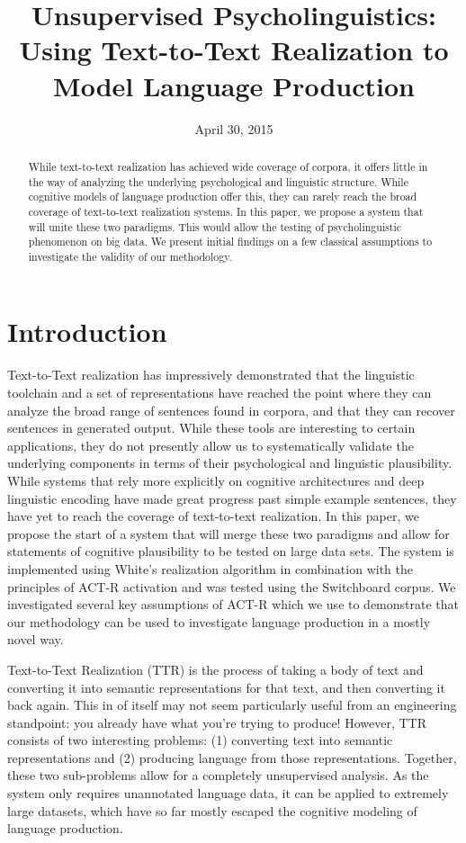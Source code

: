\documentclass[11pt]{article}
\title{Unsupervised Psycholinguistics: Using Text-to-Text Realization to Model Language Production}
\author{%
}
\date{April 30, 2015}
\begin{document}
\maketitle
\begin{abstract}
While text-to-text realization has achieved wide coverage of corpora, it offers little in the way of analyzing the underlying psychological and linguistic structure. While cognitive models of language production offer this, they can rarely reach the broad coverage of text-to-text realization systems. In this paper, we propose a system that will unite these two paradigms. This would allow the testing of psycholinguistic phenomenon on big data. We present initial findings on a few classical assumptions to investigate the validity of our methodology.  
\end{abstract}

\section{Introduction}
Text-to-Text realization has impressively demonstrated that the linguistic toolchain and a set of representations have reached the point where they can analyze the broad range of sentences found in corpora, and that they can recover sentences in generated output. While these tools are interesting to certain applications, they do not presently allow us to systematically validate the underlying components in terms of their psychological and linguistic plausibility. While systems that rely more explicitly on cognitive architectures and deep linguistic encoding have made great progress past simple example sentences, they have yet to reach the coverage of text-to-text realization. In this paper, we propose the start of a system that will merge these two paradigms  and allow for statements of cognitive plausibility to be tested on large data sets. The system is implemented using White's realization algorithm \citep{chart} in combination with the principles of ACT-R activation \citep{actr} and was tested using the Switchboard corpus. We investigated several key assumptions of ACT-R which we use to demonstrate that our methodology can be used to investigate language production in a mostly novel way.

Text-to-Text Realization (TTR) is the process of taking a body of text and converting it into semantic representations for that text, and then converting it back again. This in of itself may not seem particularly useful from an engineering standpoint: you already have what you're trying to produce! However, TTR consists of two interesting problems: (1) converting text into semantic representations and (2) producing language from those representations. Together, these two sub-problems allow for a completely unsupervised analysis. As the system only requires unannotated language data, it can be applied to extremely large datasets, which have so far mostly escaped the cognitive modeling of language production.
\end{document}
